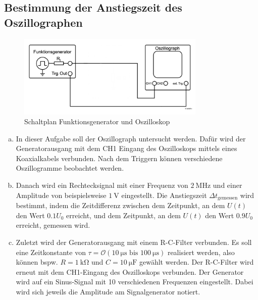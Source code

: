 \documentclass{article}
\begin{document}
		\subsection*{Bestimmung der Anstiegszeit des Oszillographen}
			\begin{figure}[H]
				\centering
				\includegraphics[width=0.8\textwidth]{figs/Aufbau_0_1_Oszilloskop.png}
				\caption{Schaltplan Funktionsgenerator und Oszilloskop~\cite{anleitung}}
				\label{fig:aufbau_0_1_oszilloskop.png}
			\end{figure}
			\begin{enumerate}[(a)]
				\item In dieser Aufgabe soll der Oszillograph untersucht werden. Dafür wird der Generatorausgang mit dem CH1 Eingang des Oszilloskops mittels eines Koaxialkabels verbunden. Nach dem Triggern können verschiedene Oszillogramme beobachtet werden.
				\item Danach wird ein Rechtecksignal mit einer Frequenz von $\SI{2}{\mega\hertz}$ und einer Amplitude von beispielsweise $\SI{1}{\volt}$ eingestellt. Die Anstiegszeit $\Delta t_\mathrm{gemessen}$ wird bestimmt, indem die Zeitdifferenz zwischen dem Zeitpunkt, an dem $U(t)$ den Wert $0.1 U_0$ erreicht, und dem Zeitpunkt, an dem $U(t)$ den Wert $0.9 U_0$ erreicht, gemessen wird.
				\item Zuletzt wird der Generatorausgang mit einem R-C-Filter verbunden. Es soll eine Zeitkonstante von $\tau = \mathcal{O}(\SI{10}{\micro\second} \text{ bis } \SI{100}{\micro\second})$ realisiert werden, also können bspw. $R = \SI{1}{\kilo\ohm}$ und $C = \SI{10}{\micro\farad}$ gewählt werden. Der R-C-Filter wird erneut mit dem CH1-Eingang des Oszilloskops verbunden. Der Generator wird auf ein Sinus-Signal mit 10 verschiedenen Frequenzen eingestellt. Dabei wird sich jeweils die Amplitude am Signalgenerator notiert.
			\end{enumerate}
			\MesswUndAusw
	
\end{document}
